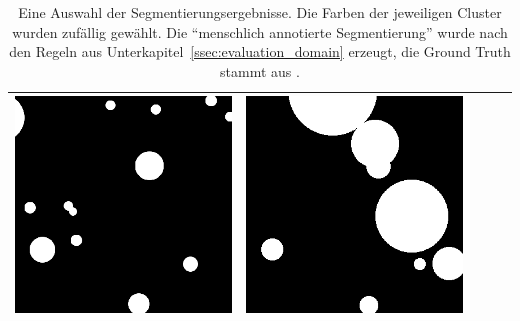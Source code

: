 \begin{table}[h!]
\begin{tabularx}{\textwidth}{>{\centering}m{}
			>{\centering}m{}
			>{\centering}m{}
			>{\centering}m{}
			>{\centering\arraybackslash}m{}}
		\includegraphics[width=0.9\linewidth]{images/gen/results_robbins/postprocessing/thm_dir_N-30_210.png_tile_160.png} &
		\includegraphics[width=0.9\linewidth]{images/gen/results_robbins/gt/thm_dir_N-30_210.png_tile_160.png} \\
		\bottomrule
	\end{tabularx}
	\caption{Eine Auswahl der Segmentierungsergebnisse. Die Farben der jeweiligen Cluster wurden zufällig gewählt. Die \enquote{menschlich annotierte Segmentierung} wurde nach den Regeln aus Unterkapitel~\ref{ssec:evaluation_domain} erzeugt, die Ground Truth stammt aus \cite{robbins_12}.}
	\label{tab:results_mars}
\end{table}

